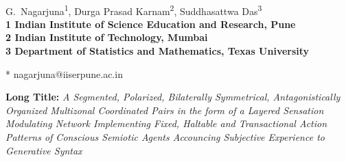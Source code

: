 \documentclass[10pt,letterpaper]{article}
\begin{document}
\vspace*{0.35in}

\begin{flushleft}
{\Large
\textbf{}
}
\newline
\\
G.~Nagarjuna\textsuperscript{1},
Durga Prasad Karnam\textsuperscript{2},
Suddhasattwa Das\textsuperscript{3}
\\
\bigskip
\bf{1} Indian Institute of Science Education and Research, Pune
\\
\bf{2} Indian Institute of Technology, Mumbai
\\
\bf{3} Department of Statistics and Mathematics, Texas University 

\bigskip
* nagarjuna@iiserpune.ac.in

\end{flushleft}
\noindent \textbf{Long Title:} \textit{A Segmented, Polarized,
  Bilaterally Symmetrical, Antagonistically Organized Multizonal
  Coordinated Pairs in the form of a Layered Sensation Modulating
  Network Implementing Fixed, Haltable and Transactional Action
  Patterns of Conscious Semiotic Agents Accouncing Subjective
  Experience to Generative Syntax}













\end{document}
